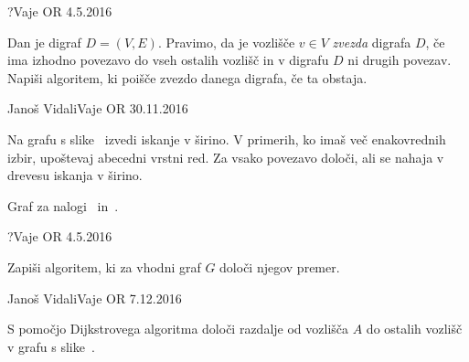 \begin{naloga}{?}{Vaje OR 4.5.2016}
\begin{vprasanje}
Dan je digraf $D = (V, E)$.
Pravimo, da je vozlišče $v \in V$ {\em zvezda} digrafa $D$,
če ima izhodno povezavo do vseh ostalih vozlišč
in v digrafu $D$ ni drugih povezav.
Napiši algoritem, ki poišče zvezdo danega digrafa, če ta obstaja.
\end{vprasanje}
\begin{odgovor}
\end{odgovor}
\end{naloga}


\begin{naloga}{Janoš Vidali}{Vaje OR 30.11.2016}
\begin{vprasanje}[bfs]
Na grafu s slike~\fig{} izvedi iskanje v širino.
V primerih, ko imaš več ena\-ko\-vred\-nih izbir,
upoštevaj abecedni vrstni red.
Za vsako povezavo določi, ali se nahaja v drevesu iskanja v širino.

\begin{slika}
\pgfslika
\caption{Graf za nalogi~\nal{} in~.}
\end{slika}
\end{vprasanje}
\begin{odgovor}
\end{odgovor}
\end{naloga}


\begin{naloga}{?}{Vaje OR 4.5.2016}
\begin{vprasanje}
Zapiši algoritem, ki za vhodni graf $G$ določi njegov premer.

\end{vprasanje}
\begin{odgovor}
\end{odgovor}
\end{naloga}


\begin{naloga}{Janoš Vidali}{Vaje OR 7.12.2016}
\begin{vprasanje}[dijkstra]
S pomočjo Dijkstrovega algoritma
določi razdalje od vozlišča $A$ do ostalih vozlišč
v grafu s slike~\fig{}.

\begin{slika}
\pgfslika
{}
\end{slika}
\end{vprasanje}
\begin{odgovor}
\end{odgovor}
\end{naloga}

